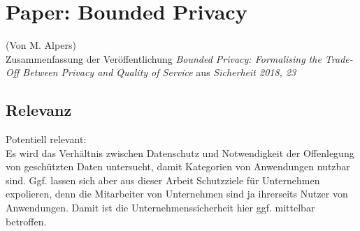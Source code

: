\chapter{Paper: Bounded Privacy}
(Von M. Alpers)\\

Zusammenfassung der Veröffentlichung \emph{Bounded Privacy: Formalising the Trade-Off Between Privacy and Quality of Service} aus \emph{Sicherheit 2018, 23}\\

\section{Relevanz}

Potentiell relevant:\\

Es wird das Verhältnis zwischen Datenschutz und Notwendigkeit der Offenlegung von geschützten Daten untersucht, damit Kategorien von Anwendungen nutzbar sind. Ggf. lassen sich aber aus dieser Arbeit Schutzziele für Unternehmen expolieren, denn die Mitarbeiter von Unternehmen sind ja ihrerseits Nutzer von Anwendungen. Damit ist die Unternehmenssicherheit hier ggf. mittelbar betroffen.